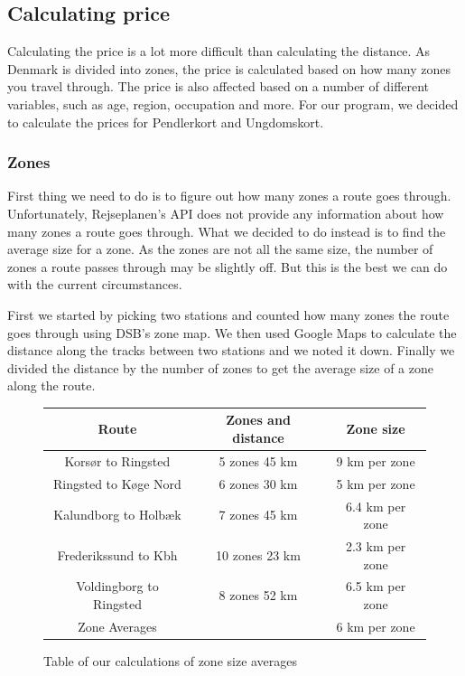 
\subsection{Calculating price}

Calculating the price is a lot more difficult than calculating the distance.
As Denmark is divided into zones, the price is calculated based on how many zones you travel through.
The price is also affected based on a number of different variables, such as age, region, occupation and more.
For our program, we decided to calculate the prices for Pendlerkort and Ungdomskort.

\subsubsection{Zones}

First thing we need to do is to figure out how many zones a route goes through.
Unfortunately, Rejseplanen's API does not provide any information about how many zones a route goes through.
What we decided to do instead is to find the average size for a zone.
As the zones are not all the same size, the number of zones a route passes through may be slightly off.
But this is the best we can do with the current circumstances.

First we started by picking two stations and counted how many zones the route goes through using DSB's zone map. %
We then used Google Maps to calculate the distance along the tracks between two stations and we noted it down.
Finally we divided the distance by the number of zones to get the average size of a zone along the route.

\begin{figure}[H]
    \centering
    \noindent
    \begin{tabular}{ || c | c | c || }
        \hline
        Route & Zones and distance & Zone size \\
        \hline\hline
        Korsør to Ringsted & 5 zones 45 km & 9 km per zone \\
        \hline
        Ringsted to Køge Nord & 6 zones 30 km & 5 km per zone \\
        \hline
        Kalundborg to Holbæk & 7 zones 45 km & 6.4 km per zone \\
        \hline
        Frederikssund to Kbh & 10 zones 23 km & 2.3 km per zone \\
        \hline
        Voldingborg to Ringsted & 8 zones 52 km & 6.5 km per zone \\
        \hline\hline
        Zone Averages & & 6 km per zone \\
        \hline
    \end{tabular}
    \caption{Table of our calculations of zone size averages}
\end{figure}


